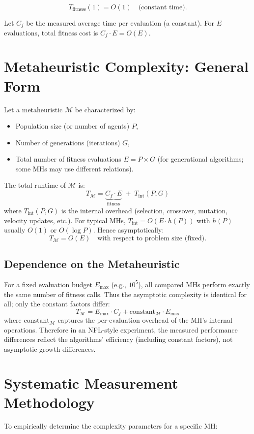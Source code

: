 \documentclass[11pt]{article}
\begin{document}
\[
T_{\text{fitness}}(1) = O(1) \quad\text{(constant time)}.
\]

Let $C_f$ be the measured average time per evaluation (a constant). For $E$ evaluations, total fitness cost is $C_f \cdot E = O(E)$.

\section{Metaheuristic Complexity: General Form}
Let a metaheuristic $\mathcal{M}$ be characterized by:
\begin{itemize}
    \item Population size (or number of agents) $P$,
    \item Number of generations (iterations) $G$,
    \item Total number of fitness evaluations $E = P \times G$ (for generational algorithms; some MHs may use different relations).
\end{itemize}
The total runtime of $\mathcal{M}$ is:
\[
T_{\mathcal{M}} = \underbrace{C_f \cdot E}_{\text{fitness}} \;+\; T_{\text{int}}(P,G)
\]
where $T_{\text{int}}(P,G)$ is the internal overhead (selection, crossover, mutation, velocity updates, etc.). For typical MHs, $T_{\text{int}} = O(E \cdot h(P))$ with $h(P)$ usually $O(1)$ or $O(\log P)$. Hence asymptotically:
\[
T_{\mathcal{M}} = O(E) \quad\text{with respect to problem size (fixed)}.
\]

\subsection{Dependence on the Metaheuristic}
For a fixed evaluation budget $E_{\max}$ (e.g., $10^5$), all compared MHs perform exactly the same number of fitness calls. Thus the asymptotic complexity is identical for all; only the constant factors differ:
\[
T_{\mathcal{M}} = E_{\max} \cdot C_f + \text{constant}_{\mathcal{M}} \cdot E_{\max}
\]
where $\text{constant}_{\mathcal{M}}$ captures the per‑evaluation overhead of the MH’s internal operations. Therefore in an NFL‑style experiment, the measured performance differences reflect the algorithms’ efficiency (including constant factors), not asymptotic growth differences.

\section{Systematic Measurement Methodology}
To empirically determine the complexity parameters for a specific MH:
\end{document}
